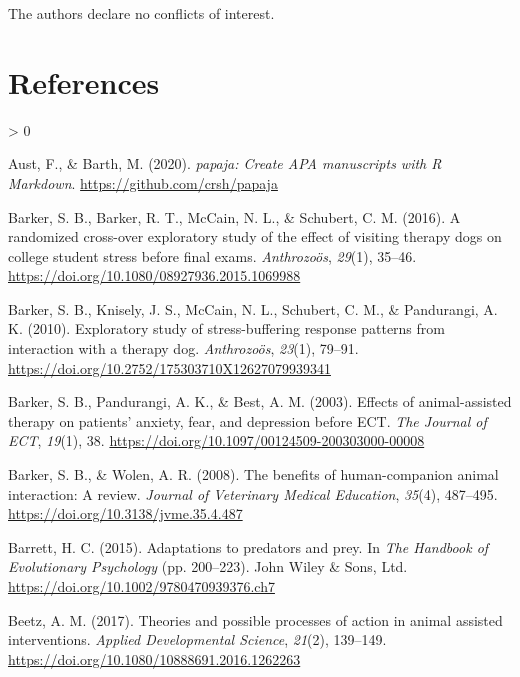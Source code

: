 \documentclass[
  english,
  pub,floatsintext]{apa6}
\newlength{\cslhangindent}
\newenvironment{CSLReferences}[2] %
 {%
  \setlength{\parindent}{0pt}
  \ifodd #1 \everypar{\setlength{\hangindent}{\cslhangindent}}\ignorespaces\fi
  \ifnum #2 > 0
  \setlength{\parskip}{#2\baselineskip}
  \fi
 }%
 {}
\begin{document}
The authors declare no conflicts of interest.

\hypertarget{references}{%
\section*{References}\label{references}}

\hypertarget{refs}{}
\begin{CSLReferences}{1}{0}
\leavevmode\hypertarget{ref-R-papaja}{}%
Aust, F., \& Barth, M. (2020). \emph{{papaja}: {Create} {APA} manuscripts with {R Markdown}}. \url{https://github.com/crsh/papaja}

\leavevmode\hypertarget{ref-Barker.etal.2016}{}%
Barker, S. B., Barker, R. T., McCain, N. L., \& Schubert, C. M. (2016). A randomized cross-over exploratory study of the effect of visiting therapy dogs on college student stress before final exams. \emph{Anthrozoös}, \emph{29}(1), 35--46. \url{https://doi.org/10.1080/08927936.2015.1069988}

\leavevmode\hypertarget{ref-Barker.etal.2010}{}%
Barker, S. B., Knisely, J. S., McCain, N. L., Schubert, C. M., \& Pandurangi, A. K. (2010). Exploratory study of stress-buffering response patterns from interaction with a therapy dog. \emph{Anthrozoös}, \emph{23}(1), 79--91. \url{https://doi.org/10.2752/175303710X12627079939341}

\leavevmode\hypertarget{ref-Barker.etal.2003}{}%
Barker, S. B., Pandurangi, A. K., \& Best, A. M. (2003). Effects of animal-assisted therapy on patients' anxiety, fear, and depression before {ECT}. \emph{The Journal of ECT}, \emph{19}(1), 38. \url{https://doi.org/10.1097/00124509-200303000-00008}

\leavevmode\hypertarget{ref-Barker.Wolen.2008}{}%
Barker, S. B., \& Wolen, A. R. (2008). The benefits of human-companion animal interaction: {A} review. \emph{Journal of Veterinary Medical Education}, \emph{35}(4), 487--495. \url{https://doi.org/10.3138/jvme.35.4.487}

\leavevmode\hypertarget{ref-Barrett.2015}{}%
Barrett, H. C. (2015). Adaptations to predators and prey. In \emph{The {Handbook} of {Evolutionary Psychology}} (pp. 200--223). {John Wiley \& Sons, Ltd}. \url{https://doi.org/10.1002/9780470939376.ch7}

\leavevmode\hypertarget{ref-Beetz.2017}{}%
Beetz, A. M. (2017). Theories and possible processes of action in animal assisted interventions. \emph{Applied Developmental Science}, \emph{21}(2), 139--149. \url{https://doi.org/10.1080/10888691.2016.1262263}


\end{CSLReferences}
\end{document}
